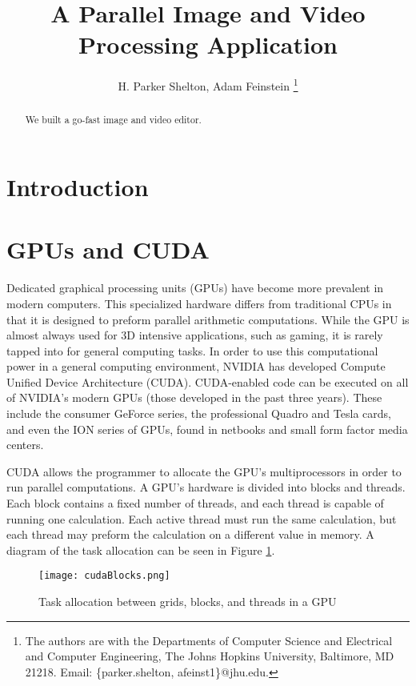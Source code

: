 \documentclass[10pt,twocolumn,twoside]{IEEEtran}
\begin{document}
\title{A Parallel Image and Video Processing Application}
\author{H. Parker Shelton, Adam Feinstein
\thanks{The authors are with the Departments of Computer Science and Electrical and Computer Engineering, The Johns Hopkins University, Baltimore, MD 21218.
Email: \{parker.shelton, afeinst1\}@jhu.edu.}}

\maketitle
\vskip -20pt

\begin{abstract}
We built a go-fast image and video editor.
\end{abstract}

\section{Introduction}

\section{GPUs and CUDA}
Dedicated graphical processing units (GPUs) have become more prevalent in modern computers. This specialized hardware differs from traditional CPUs in that it is designed to preform parallel arithmetic computations. While the GPU is almost always used for 3D intensive applications, such as gaming, it is rarely tapped into for general computing tasks. In order to use this computational power in a general computing environment, NVIDIA has developed Compute Unified Device Architecture (CUDA). CUDA-enabled code can be executed on all of NVIDIA's modern GPUs (those developed in the past three years). These include the consumer GeForce series, the professional Quadro and Tesla cards, and even the ION series of GPUs, found in netbooks and small form factor media centers.
	
CUDA allows the programmer to allocate the GPU's multiprocessors in order to run parallel computations. A GPU's hardware is divided into blocks and threads. Each block contains a fixed number of threads, and each thread is capable of running one calculation. Each active thread must run the same calculation, but each thread may preform the calculation on a different value in memory. A diagram of the task allocation can be seen in Figure \ref{fig:cudaBlocks}.

\begin{figure}[h]
\begin{center}
\texttt{[image: cudaBlocks.png]}
\caption{Task allocation between grids, blocks, and threads in a GPU}
\label{fig:cudaBlocks}
\end{center}
\end{figure}
	
\end{document}
